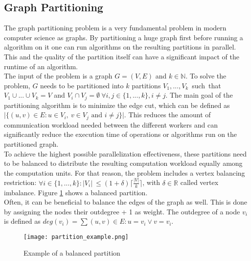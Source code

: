 \documentclass[acmsmall,nonacm,screen,review]{acmart}
\begin{document}
\subsection{Graph Partitioning}
The graph partitioning problem is a very fundamental problem in modern computer science as graphs. By partitioning a huge graph first before running a algorithm on it one can run algorithms on the resulting partitions in parallel. This and the quality of the partition itself can have a significant impact of the runtime of an algorithm. \\ 
The input of the problem is a graph $G = (V,E)$ and $k\in \mathbb{N}$. To solve the problem, $G$ needs to be partitioned into $k$ partitions \hbox{$V_{1},...,V_{k}$ such that $V_{1}\cup...\cup V_{k} = V$} and $V_{i}\cap V_{j} = \emptyset\ \forall i,j\in \{1,...,k\}, i \neq j$. The main goal of the partitioning algorithm is to minimize the edge cut, which can be defined as $\vert \{(u,v)\in E : u\in V_{i},\ v\in V_{j} \text{ and } i\neq j \}\vert$. This reduces the amount of communication workload needed between the different workers and can significantly reduce the execution time of operations or algorithms run on the partitioned graph.  \\
To achieve the highest possible parallelization effectiveness, these partitions need to be balanced to distribute the resulting computation workload equally among the computation units. For that reason, the problem includes a vertex balancing restriction: $\forall i\in \{1,...,k\} : \vert V_{i}\vert \ \leq (1 + \delta) \lceil \frac{\vert V \vert }{k} \rceil $, with $\delta \in \mathbb{R}$ called vertex imbalance. Figure \ref{partition} shows a balanced partition. \\
Often, it can be beneficial to balance the edges of the graph as well. This is done by assigning the nodes their outdegree + 1 as weight. The outdegree of a node $v_{i}$ is defined as $deg(v_{i}) = \sum{(u,v)\in E : u = v_{i} \vee v = v_{i}}$.
\begin{figure}[bt!]
\centering
\caption{Example of a balanced partition}
\label{partition}
\texttt{[image: partition\_example.png]}
\end{figure}
\end{document}
